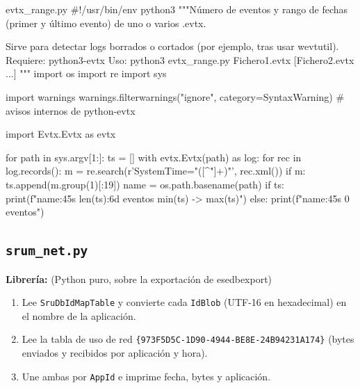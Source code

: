 \documentclass[11pt,a4paper]{article}
\begin{document}
\begin{codigopython}{evtx\_range.py}
#!/usr/bin/env python3
"""Número de eventos y rango de fechas (primer y último evento) de uno o varios .evtx.

Sirve para detectar logs borrados o cortados (por ejemplo, tras usar wevtutil).
Requiere: python3-evtx
Uso: python3 evtx_range.py Fichero1.evtx [Fichero2.evtx ...]
"""
import os
import re
import sys

import warnings
warnings.filterwarnings("ignore", category=SyntaxWarning)  # avisos internos de python-evtx

import Evtx.Evtx as evtx

for path in sys.argv[1:]:
    ts = []
    with evtx.Evtx(path) as log:
        for rec in log.records():
            m = re.search(r'SystemTime="([^"]+)"', rec.xml())
            if m:
                ts.append(m.group(1)[:19])
    name = os.path.basename(path)
    if ts:
        print(f"{name:45s} {len(ts):6d} eventos   {min(ts)}  ->  {max(ts)}")
    else:
        print(f"{name:45s}      0 eventos")
\end{codigopython}

\subsection{\texttt{srum\_net.py}}
\textbf{Librería:} (Python puro, sobre la exportación de esedbexport)
\begin{enumerate}

\item Lee \texttt{SruDbIdMapTable} y convierte cada \texttt{IdBlob} (UTF-16 en hexadecimal) en el nombre de la aplicación.

\item Lee la tabla de uso de red \texttt{\{973F5D5C-1D90-4944-BE8E-24B94231A174\}} (bytes enviados y recibidos por aplicación y hora).

\item Une ambas por \texttt{AppId} e imprime fecha, bytes y aplicación.

\end{enumerate}
\end{document}

